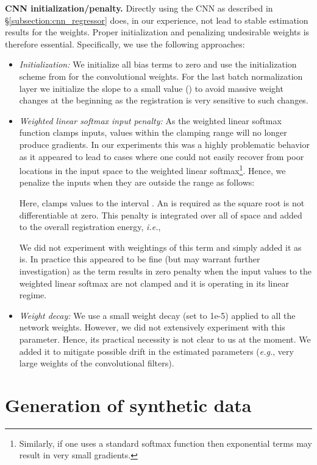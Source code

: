 \documentclass[10pt,twocolumn,letterpaper,table]{article}
\numberwithin{equation}{section}
\theoremstyle{plain}
\theoremstyle{definition}
\def\eg{\emph{e.g.}}  \def\Eg{\emph{E.g.}}
\def\ie{\emph{i.e.}}  \def\Ie{\emph{I.e.}}
\begin{document}
\noindent
{\bf CNN initialization/penalty.} Directly using the CNN as described in \S\ref{subsection:cnn_regressor} does, in our experience, not lead to stable estimation results for the weights. Proper initialization and penalizing undesirable weights is therefore essential. Specifically, we use the following approaches:
\begin{itemize}
\item[1)] {\it Initialization:} We initialize all bias terms to zero and use the initialization scheme from \cite{He15a} for the convolutional weights. For the last batch normalization layer we initialize the slope to a small value () to avoid massive weight changes at the beginning as the registration is very sensitive to such changes.
\item[2)] {\it Weighted linear softmax input penalty:} As the  weighted linear softmax function clamps inputs, values within the clamping range will no longer produce gradients. In our experiments this was a highly problematic behavior as it appeared to lead to cases where one could not easily recover from poor locations in the input space to the weighted linear softmax\footnote{Similarly, if one uses a standard softmax function then exponential terms may result in very small gradients.}. Hence, we penalize the inputs when they are outside the  range as follows:
  
  Here,  clamps values to the interval . An  is required as the square root is not differentiable at zero. This penalty is integrated over all of space and added to the overall registration energy, \ie,
  
  We did not experiment with weightings of this term and simply added it as is. In practice this appeared to be fine (but may warrant further investigation) as the term results in zero penalty when the input values to the weighted linear softmax are not clamped and it is operating in its linear regime. 
\item[3)] {\it Weight decay:} We use a small weight decay \cite{Hanson88a} (set to 1e-5) applied to all the network weights. However, we did not extensively experiment with this parameter. Hence, its practical necessity is not clear to us at the moment. We added it to mitigate possible drift in the estimated parameters (\eg, very large weights of the convolutional filters). 
\end{itemize}

\section{Generation of synthetic data}
\label{sec:synthetic_experiment_setup}
\end{document}

